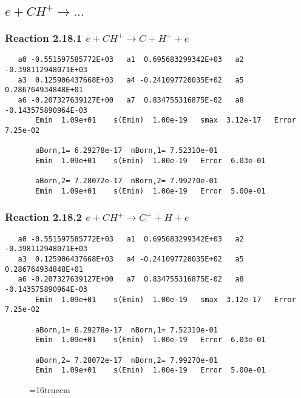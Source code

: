 \documentclass[12pt]{article}
\begin{document}
\subsection{
$e + CH^+ \rightarrow ... $
}

 
\subsubsection{
Reaction 2.18.1   $e + CH^+ \rightarrow C + H^+ + e$
}

\begin{small}\begin{verbatim} 
   a0 -0.551597585772E+03   a1  0.695683299342E+03   a2 -0.398112948071E+03
   a3  0.125906437668E+03   a4 -0.241097720035E+02   a5  0.286764934848E+01
   a6 -0.207327639127E+00   a7  0.834755316875E-02   a8 -0.143575890964E-03
       Emin  1.09e+01    s(Emin)  1.00e-19   smax  3.12e-17   Error  7.25e-02
 
       aBorn,1= 6.29278e-17  nBorn,1= 7.52310e-01
       Emin  1.09e+01    s(Emin)  1.00e-19   Error  6.03e-01
 
       aBorn,2= 7.28072e-17  nBorn,2= 7.99270e-01
       Emin  1.09e+01    s(Emin)  1.00e-19   Error  5.00e-01
\end{verbatim}\end{small}

\subsubsection{
Reaction 2.18.2   $e + CH^+ \rightarrow C^+ + H + e$
}

\begin{small}\begin{verbatim} 
   a0 -0.551597585772E+03   a1  0.695683299342E+03   a2 -0.398112948071E+03
   a3  0.125906437668E+03   a4 -0.241097720035E+02   a5  0.286764934848E+01
   a6 -0.207327639127E+00   a7  0.834755316875E-02   a8 -0.143575890964E-03
       Emin  1.09e+01    s(Emin)  1.00e-19   smax  3.12e-17   Error  7.25e-02
 
       aBorn,1= 6.29278e-17  nBorn,1= 7.52310e-01
       Emin  1.09e+01    s(Emin)  1.00e-19   Error  6.03e-01
 
       aBorn,2= 7.28072e-17  nBorn,2= 7.99270e-01
       Emin  1.09e+01    s(Emin)  1.00e-19   Error  5.00e-01
\end{verbatim}\end{small}

\begin{figure} \label{met.1_2.18}
\epsfxsize=16truecm
\end{figure}
\newpage
\end{document}
